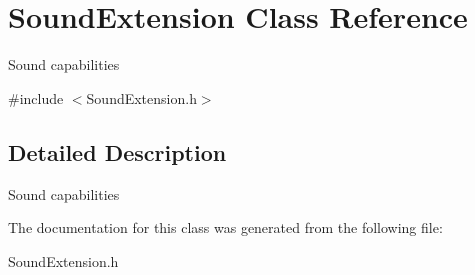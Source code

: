 \hypertarget{class_sound_extension}{}\section{Sound\+Extension Class Reference}
\label{class_sound_extension}


Sound capabilities  




{\ttfamily \#include $<$Sound\+Extension.\+h$>$}



\subsection{Detailed Description}
Sound capabilities 



The documentation for this class was generated from the following file\+:\begin{DoxyCompactItemize}
\item 
Sound\+Extension.\+h\end{DoxyCompactItemize}
